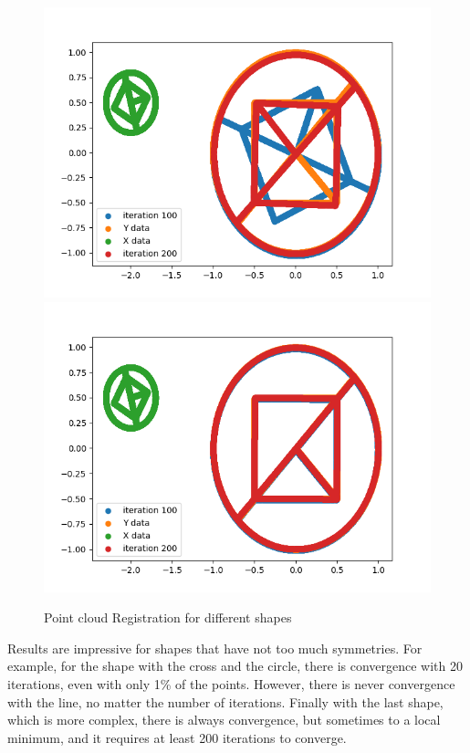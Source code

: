 \documentclass[a4paper,12pt]{article}
\begin{document}
\begin{figure}[H]
\includegraphics[scale = 0.45]{circle_shape.png}
\includegraphics[scale = 0.45]{circle_shape2.png}
\caption{Point cloud Registration for different shapes}\label{shape}
\end{figure}

Results are impressive for shapes that have not too much symmetries. For example, for the shape with the cross and the circle, there is convergence with 20 iterations, even with only 1\% of the points. However, there is never convergence with the line, no matter the number of iterations. Finally with the last shape, which is more complex, there is always convergence, but sometimes to a local minimum, and it requires at least 200 iterations to converge.
\end{document}
